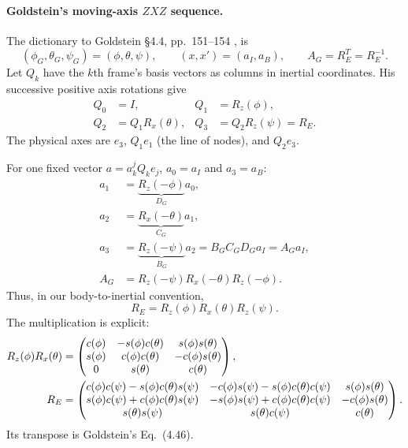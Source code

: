 \paragraph{Goldstein's moving-axis $ZXZ$ sequence.}
The dictionary to Goldstein \S4.4, pp.~151--154
\cite{dgdt:GPS2001}, is
\[
 (\phi_G,\theta_G,\psi_G)=(\phi,\theta,\psi),\qquad
 (x,x')=(a_I,a_B),\qquad A_G=R_E^T=R_E^{-1}.
\]
Let $Q_k$ have the $k$th frame's basis vectors as columns in inertial
coordinates. His successive positive axis rotations give
\begin{equation}\label{gnc:zxz-frames}
 \begin{aligned}
 Q_0&=I,& Q_1&=R_z(\phi),\\
 Q_2&=Q_1R_x(\theta),& Q_3&=Q_2R_z(\psi)=R_E.
 \end{aligned}
\end{equation}
The physical axes are $e_3$, $Q_1e_1$ (the line of nodes), and $Q_2e_3$.

For one fixed vector $a=a_k^jQ_ke_j$, $a_0=a_I$ and $a_3=a_B$:
\begin{equation}\label{gnc:goldstein-passive-sequence}
 \begin{aligned}
 a_1&=\underbrace{R_z(-\phi)}_{D_G}a_0,\\
 a_2&=\underbrace{R_x(-\theta)}_{C_G}a_1,\\
 a_3&=\underbrace{R_z(-\psi)}_{B_G}a_2
     =B_GC_GD_Ga_I=A_Ga_I,\\
 A_G&=R_z(-\psi)R_x(-\theta)R_z(-\phi).
 \end{aligned}
\end{equation}
Thus, in our body-to-inertial convention,
\begin{equation}\label{gnc:zxz-angles}
 R_E=R_z(\phi)R_x(\theta)R_z(\psi).
\end{equation}
The multiplication is explicit:
\begin{align}
 R_z(\phi)R_x(\theta)
 &=\begin{pmatrix}
 c(\phi)&-s(\phi)c(\theta)&s(\phi)s(\theta)\\
 s(\phi)&c(\phi)c(\theta)&-c(\phi)s(\theta)\\
 0&s(\theta)&c(\theta)
 \end{pmatrix},\notag\\
 R_E&=\begin{pmatrix}
 c(\phi)c(\psi)-s(\phi)c(\theta)s(\psi)&
 -c(\phi)s(\psi)-s(\phi)c(\theta)c(\psi)&s(\phi)s(\theta)\\
 s(\phi)c(\psi)+c(\phi)c(\theta)s(\psi)&
 -s(\phi)s(\psi)+c(\phi)c(\theta)c(\psi)&-c(\phi)s(\theta)\\
 s(\theta)s(\psi)&s(\theta)c(\psi)&c(\theta)
 \end{pmatrix}.\label{gnc:zxz-expanded}
\end{align}
Its transpose is Goldstein's Eq.~(4.46).


